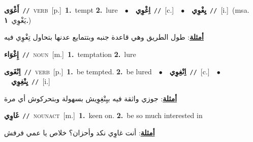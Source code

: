 \documentclass[10pt,a4paper,twoside]{article} %
\begin{document}
\begin{multicols}{2}
{\setlength\topsep{0pt}\textbf{\foreignlanguage{arabic}{أَغْوَى}}\ {\color{gray}\texttt{//}\color{black}}\ \textsc{verb}\ [p.]\ \textbf{1.}~tempt  \textbf{2.}~lure\ \ $\bullet$\ \ \setlength\topsep{0pt}\textbf{\foreignlanguage{arabic}{اِغْوِي}}\ {\color{gray}\texttt{//}\color{black}}\ [c.]\ \ $\bullet$\ \ \setlength\topsep{0pt}\textbf{\foreignlanguage{arabic}{يِغْوِي}}\ {\color{gray}\texttt{//}\color{black}}\ [i.]\ \color{gray}(msa. \foreignlanguage{arabic}{يَغْوِي}~\foreignlanguage{arabic}{\textbf{١.}})\color{black}\  \begin{flushright}\color{gray}\foreignlanguage{arabic}{\textbf{\underline{\foreignlanguage{arabic}{أمثلة}}}: طول الطريق وهي قاعدة جنبه وبتتمايع عدنها بتحاول تِغْوِي فيه}\end{flushright}\color{black}} \vspace{2mm}

{\setlength\topsep{0pt}\textbf{\foreignlanguage{arabic}{إِغْوَاء}}\ {\color{gray}\texttt{//}\color{black}}\ \textsc{noun}\ [m.]\ \textbf{1.}~temptation  \textbf{2.}~lure\ } \vspace{2mm}

{\setlength\topsep{0pt}\textbf{\foreignlanguage{arabic}{اِنْغَوى}}\ {\color{gray}\texttt{//}\color{black}}\ \textsc{verb}\ [p.]\ \textbf{1.}~be tempted.  \textbf{2.}~be lured\ \ $\bullet$\ \ \setlength\topsep{0pt}\textbf{\foreignlanguage{arabic}{اِنْغِوِي}}\ {\color{gray}\texttt{//}\color{black}}\ [c.]\ \ $\bullet$\ \ \setlength\topsep{0pt}\textbf{\foreignlanguage{arabic}{يِنْغِوِي}}\ {\color{gray}\texttt{//}\color{black}}\ [i.]\  \begin{flushright}\color{gray}\foreignlanguage{arabic}{\textbf{\underline{\foreignlanguage{arabic}{أمثلة}}}: جوزي واثقة فيه بيِنْغِوِيش بسهولة وبتحركوش أي مرة}\end{flushright}\color{black}} \vspace{2mm}

{\setlength\topsep{0pt}\textbf{\foreignlanguage{arabic}{غَاوِي}}\ {\color{gray}\texttt{//}\color{black}}\ \textsc{noun\textunderscore act}\ [m.]\ \textbf{1.}~keen on.  \textbf{2.}~be so much interested in\  \begin{flushright}\color{gray}\foreignlanguage{arabic}{\textbf{\underline{\foreignlanguage{arabic}{أمثلة}}}: أنت غاوِي نكد وأحزان؟ خلاص يا عمي فرفش}\end{flushright}\color{black}} \vspace{2mm}


\end{multicols}
\end{document}

